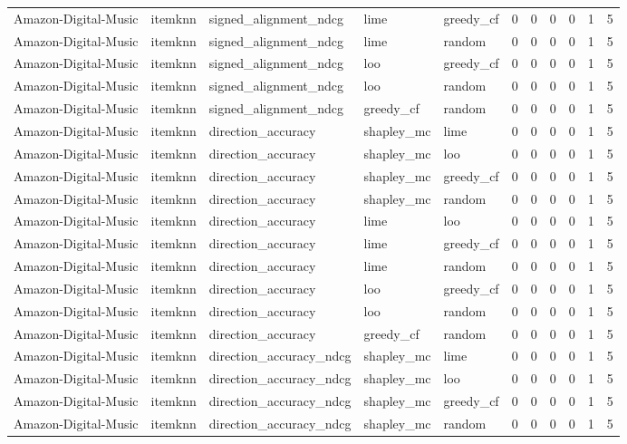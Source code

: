 \begin{table}[t]
{\begin{tabular}{lllllrrrrrr}
Amazon-Digital-Music & itemknn & signed\_alignment\_ndcg & lime & greedy\_cf & 0 & 0 & 0 & 0 & 1 & 5 \\
Amazon-Digital-Music & itemknn & signed\_alignment\_ndcg & lime & random & 0 & 0 & 0 & 0 & 1 & 5 \\
Amazon-Digital-Music & itemknn & signed\_alignment\_ndcg & loo & greedy\_cf & 0 & 0 & 0 & 0 & 1 & 5 \\
Amazon-Digital-Music & itemknn & signed\_alignment\_ndcg & loo & random & 0 & 0 & 0 & 0 & 1 & 5 \\
Amazon-Digital-Music & itemknn & signed\_alignment\_ndcg & greedy\_cf & random & 0 & 0 & 0 & 0 & 1 & 5 \\
Amazon-Digital-Music & itemknn & direction\_accuracy & shapley\_mc & lime & 0 & 0 & 0 & 0 & 1 & 5 \\
Amazon-Digital-Music & itemknn & direction\_accuracy & shapley\_mc & loo & 0 & 0 & 0 & 0 & 1 & 5 \\
Amazon-Digital-Music & itemknn & direction\_accuracy & shapley\_mc & greedy\_cf & 0 & 0 & 0 & 0 & 1 & 5 \\
Amazon-Digital-Music & itemknn & direction\_accuracy & shapley\_mc & random & 0 & 0 & 0 & 0 & 1 & 5 \\
Amazon-Digital-Music & itemknn & direction\_accuracy & lime & loo & 0 & 0 & 0 & 0 & 1 & 5 \\
Amazon-Digital-Music & itemknn & direction\_accuracy & lime & greedy\_cf & 0 & 0 & 0 & 0 & 1 & 5 \\
Amazon-Digital-Music & itemknn & direction\_accuracy & lime & random & 0 & 0 & 0 & 0 & 1 & 5 \\
Amazon-Digital-Music & itemknn & direction\_accuracy & loo & greedy\_cf & 0 & 0 & 0 & 0 & 1 & 5 \\
Amazon-Digital-Music & itemknn & direction\_accuracy & loo & random & 0 & 0 & 0 & 0 & 1 & 5 \\
Amazon-Digital-Music & itemknn & direction\_accuracy & greedy\_cf & random & 0 & 0 & 0 & 0 & 1 & 5 \\
Amazon-Digital-Music & itemknn & direction\_accuracy\_ndcg & shapley\_mc & lime & 0 & 0 & 0 & 0 & 1 & 5 \\
Amazon-Digital-Music & itemknn & direction\_accuracy\_ndcg & shapley\_mc & loo & 0 & 0 & 0 & 0 & 1 & 5 \\
Amazon-Digital-Music & itemknn & direction\_accuracy\_ndcg & shapley\_mc & greedy\_cf & 0 & 0 & 0 & 0 & 1 & 5 \\
Amazon-Digital-Music & itemknn & direction\_accuracy\_ndcg & shapley\_mc & random & 0 & 0 & 0 & 0 & 1 & 5 \\

\end{tabular}}
\end{table}
